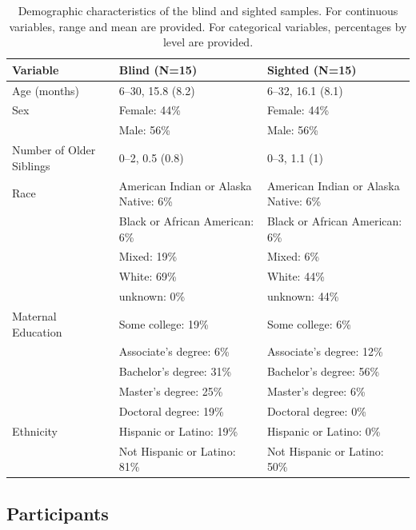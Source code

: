 \documentclass[
  man]{apa6}
\begin{document}
\begin{table}

\caption{\label{tab:participant-characteristics}Demographic characteristics of the blind and sighted samples. For continuous variables, range and mean are provided. For categorical variables, percentages by level are provided.}
\centering
\fontsize{8}{10}\selectfont
\begin{tabular}[t]{l|l|l}
\hline
Variable & Blind (N=15) & Sighted (N=15)\\
\hline
Age (months) & 6--30,
15.8 (8.2) & 6--32,
16.1 (8.1)\\
\hline
Sex & Female: 44\% & Female: 44\%\\
\hline
 & Male: 56\% & Male: 56\%\\
\hline
Number of Older Siblings & 0--2,
0.5 (0.8) & 0--3,
1.1 (1)\\
\hline
Race & American Indian or Alaska Native: 6\% & American Indian or Alaska Native: 6\%\\
\hline
 & Black or African American: 6\% & Black or African American: 6\%\\
\hline
 & Mixed: 19\% & Mixed: 6\%\\
\hline
 & White: 69\% & White: 44\%\\
\hline
 & unknown: 0\% & unknown: 44\%\\
\hline
Maternal Education & Some college: 19\% & Some college: 6\%\\
\hline
 & Associate's degree: 6\% & Associate's degree: 12\%\\
\hline
 & Bachelor's degree: 31\% & Bachelor's degree: 56\%\\
\hline
 & Master's degree: 25\% & Master's degree: 6\%\\
\hline
 & Doctoral degree: 19\% & Doctoral degree: 0\%\\
\hline
Ethnicity & Hispanic or Latino: 19\% & Hispanic or Latino: 0\%\\
\hline
 & Not Hispanic or Latino: 81\% & Not Hispanic or Latino: 50\%\\
\hline
\end{tabular}
\end{table}

\hypertarget{participants}{%
\subsection{Participants}\label{participants}}
\end{document}
